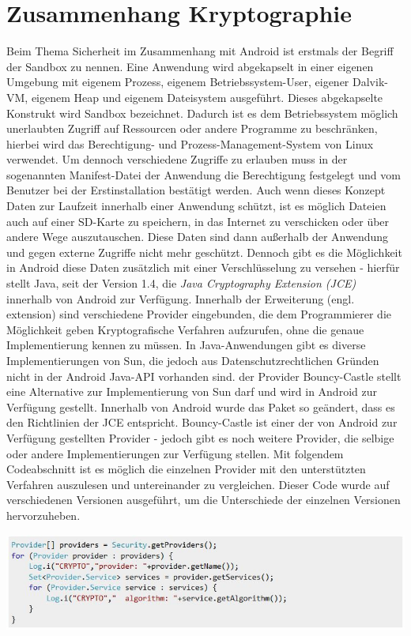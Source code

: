 \documentclass[10pt, a4paper,headsepline]{scrreprt}
\begin{document}
\section{Zusammenhang Kryptographie}
Beim Thema Sicherheit im Zusammenhang mit Android ist erstmals der Begriff der Sandbox zu nennen. Eine Anwendung wird abgekapselt in einer eigenen Umgebung mit eigenem Prozess, eigenem Betriebssystem-User, eigener Dalvik-VM, eigenem Heap und eigenem Dateisystem ausgeführt. Dieses abgekapselte Konstrukt wird Sandbox bezeichnet. Dadurch ist es dem Betriebssystem möglich unerlaubten Zugriff auf Ressourcen oder andere Programme zu beschränken, hierbei wird das Berechtigung- und Prozess-Management-System von Linux verwendet. %
Um dennoch verschiedene Zugriffe zu erlauben muss in der sogenannten Manifest-Datei der Anwendung die Berechtigung festgelegt und vom Benutzer bei der Erstinstallation bestätigt werden.
Auch wenn dieses Konzept Daten zur Laufzeit innerhalb einer Anwendung schützt, ist es möglich Dateien auch auf einer SD-Karte zu speichern, in das Internet zu verschicken oder über andere Wege auszutauschen. Diese Daten sind dann außerhalb der Anwendung und gegen externe Zugriffe nicht mehr geschützt.
Dennoch gibt es die Möglichkeit in Android diese Daten zusätzlich mit einer Verschlüsselung zu versehen - hierfür stellt Java, seit der Version 1.4, die \textit{Java Cryptography Extension (JCE)} innerhalb von Android zur Verfügung. Innerhalb der Erweiterung (engl. extension) sind verschiedene Provider eingebunden, die dem Programmierer die Möglichkeit geben Kryptografische Verfahren aufzurufen, ohne die genaue Implementierung kennen zu müssen. In Java-Anwendungen gibt es diverse Implementierungen von Sun, die jedoch aus Datenschutzrechtlichen Gründen nicht in der Android Java-API vorhanden sind. der Provider Bouncy-Castle stellt eine Alternative zur Implementierung von Sun darf und wird in Android zur Verfügung gestellt. Innerhalb von Android wurde das Paket so geändert, dass es den Richtlinien der JCE entspricht. 
Bouncy-Castle ist einer der von Android zur Verfügung gestellten Provider - jedoch gibt es noch weitere Provider, die selbige oder andere Implementierungen zur Verfügung stellen. Mit folgendem Codeabschnitt ist es möglich die einzelnen Provider mit den unterstützten Verfahren auszulesen und untereinander zu vergleichen. Dieser Code wurde auf verschiedenen Versionen ausgeführt, um die Unterschiede der einzelnen Versionen hervorzuheben. \\
\begin{center}
\includegraphics[scale=0.8]{read_cryptoprovider.JPG} %
\end{center}
\end{document}
